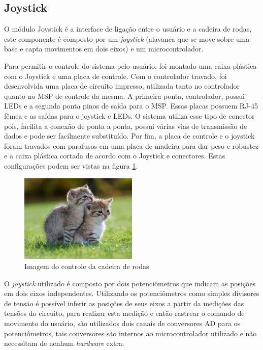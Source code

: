 \subsection{Joystick}
\label{ssec:joystick}
O módulo Joystick é a interface de ligação entre o usuário e a cadeira de rodas, este componente é composto por um \textit{joystick} (alavanca que se move sobre uma base e capta movimentos em dois eixos) e um microcontrolador.

Para permitir o controle do sistema pelo usuário, foi montado uma caixa plástica com o Joystick e uma placa de controle. Com o controlador travado, foi desenvolvida uma placa de circuito impresso, utilizada tanto no controlador quanto no MSP de controle da mesma. A primeira ponta, controlador, possui LEDs e a segunda ponta pinos de saída para o MSP. Essas placas possuem RJ-45 fêmea e as saídas para o joystick e LEDs. O sistema utiliza esse tipo de conector pois, facilita a conexão de ponta a ponta, possui várias vias de transmissão de dados e pode ser facilmente substituído. Por fim, a placa de controle e o joystick foram travados com parafusos em uma placa de madeira para dar peso e robustez e a caixa plástica cortada de acordo com o Joystick e conectores. Estas configurações podem ser vistas na figura \ref{fig:joy_hand_control}.

\begin{figure}[!htb]
\centering
\includegraphics[width = 0.5\textwidth]{figuras/resultados/joy_hand_control}
\caption{Imagem do controle da cadeira de rodas}
\label{fig:joy_hand_control}
\end{figure}

O \textit{joystick} utilizado é composto por dois potenciômetros que indicam as posições em dois eixos independentes. Utilizando os potenciômetros como simples divisores de tensão é possível inferir as posições de seus eixos a partir da medições das tensões do circuito, para realizar esta medição e então rastrear o comando de movimento do usuário, são utilizados dois canais de conversores AD para os potenciômetros, tais conversores são internos ao microcontrolador utilizado e não necessitam de nenhum \textit{hardware} extra.

